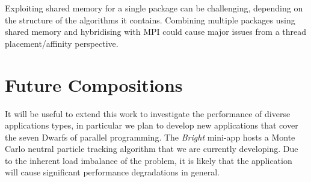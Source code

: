\documentclass[runningheads,a4paper]{llncs}
\begin{document}
Exploiting shared memory for a single package can be challenging, depending on the structure of the algorithms it contains. Combining multiple packages using shared memory and hybridising with MPI could cause major issues from a thread placement/affinity perspective.


%
%
%

\section{Future Compositions}

It will be useful to extend this work to investigate the performance of diverse applications types, in particular we plan to develop new applications that cover the seven Dwarfs of parallel programming. The \textit{Bright} mini-app hosts a Monte Carlo neutral particle tracking algorithm that we are currently developing. Due to the inherent load imbalance of the problem, it is likely that the application will cause significant performance degradations in general.
\end{document}
